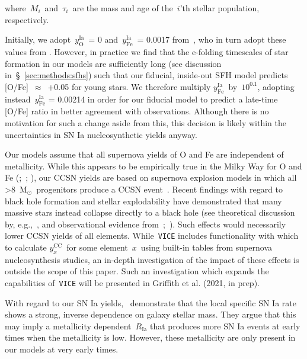 \documentclass[fleqn, usenatbib]{mnras}
\newcommand{\msun}{\ensuremath{\text{M}_\odot}}
\begin{document}
where~$M_i$~and~$\tau_i$~are the mass and age of the~$i$'th stellar population, 
respectively. 
\par 
Initially, we adopt~$y_\text{O}^\text{Ia}$~= 0 and~$y_\text{Fe}^\text{Ia}$~= 
0.0017 from~\citet{Johnson2020}, who in turn adopt these values from 
\citet{Weinberg2017}. However, in practice we find that the e-folding 
timescales of star formation in our models are sufficiently long (see 
discussion in~\S~\ref{sec:methods:sfhs}) such that our fiducial, inside-out SFH 
model predicts [O/Fe]~$\approx$~+0.05 for young stars. We therefore multiply 
$y_\text{Fe}^\text{Ia}$~by~$10^{0.1}$, adopting instead~$y_\text{Fe}^\text{Ia}$ 
= 0.00214 in order for our fiducial model to predict a late-time [O/Fe] ratio 
in better agreement with observations. Although there is no motivation for such 
a change aside from this, this decision is likely within the uncertainties in 
SN Ia nucleosynthetic yields anyway. 
\par 
Our models assume that all supernova yields of O and Fe are independent of 
metallicity. While this appears to be empirically true in the Milky Way for O 
and Fe (\citealp{Weinberg2019};~\citealp*{Griffith2019}; 
\citealp{Griffith2020}), our CCSN yields are based on 
supernova explosion models in which all >8~\msun~progenitors produce a CCSN 
event~\citep[e.g.][]{Chieffi2004, Chieffi2013}. Recent findings with regard to 
black hole formation and stellar explodability have demonstrated that many 
massive stars instead collapse directly to a black hole (see theoretical 
discussion by, e.g.,~\citealp{Pejcha2015, Sukhbold2016, Ertl2016}, and 
observational evidence from~\citealp*{Gerke2015};~\citealp{Adams2017, 
Basinger2020}). Such effects would necessarily lower CCSN yields of all 
elements. While~\texttt{VICE} includes functionality with which to calculate 
$y_x^\text{CC}$~for some element~$x$~using built-in tables from supernova 
nucleosynthesis studies, an in-depth investigation of the impact of these 
effects is outside the scope of this paper. Such an investigation which expands 
the capabilities of~\texttt{VICE} will be presented in Griffith et al. (2021, 
in prep). 
\par 
With regard to our SN Ia yields,~\citet{Brown2019} demonstrate that the local 
specific SN Ia rate shows a strong, inverse dependence on galaxy stellar mass. 
They argue that this may imply a metallicity dependent~$R_\text{Ia}$ that 
produces more SN Ia events at early times when the metallicity is low. However, 
these metallicity are only present in our models at very early times. 
\end{document}
